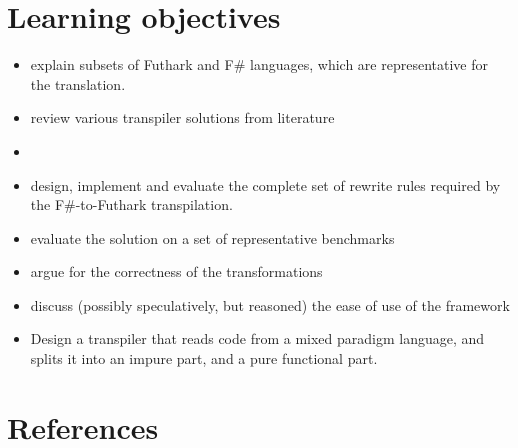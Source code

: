 \documentclass{article}
\begin{document}
\section{Learning objectives}
\begin{itemize}
    \item explain subsets of Futhark and F\# languages, which are representative 
            for the translation.
    \item review various transpiler solutions from literature
    \item 
    \item design, implement and evaluate the complete set of rewrite 
            rules required by the F\#-to-Futhark transpilation.
    \item evaluate the solution on a set of representative benchmarks
    \item argue for the correctness of the transformations
    \item discuss (possibly speculatively, but reasoned) the ease of use of the framework
    \item Design a transpiler that reads code from a mixed paradigm language,
    and splits it into an impure part, and a pure functional part.
    
\end{itemize}

\section*{References}
\end{document}
